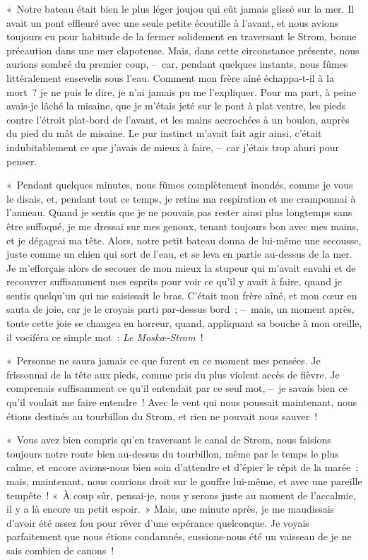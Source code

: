 \documentclass[french,twoside]{book} %
\begin{document}
« Notre bateau était bien le plus léger joujou qui eût jamais glissé sur la mer. Il avait un pont effleuré avec une seule petite écoutille à l’avant, et nous avions toujours eu pour habitude de la fermer solidement en traversant le Strom, bonne précaution dans une mer clapoteuse. Mais, dans cette circonstance présente, nous aurions sombré du premier coup, – car, pendant quelques instants, nous fûmes littéralement ensevelis sous l’eau. Comment mon frère aîné échappa-t-il à la mort ? je ne puis le dire, je n’ai jamais pu me l’expliquer. Pour ma part, à peine avais-je lâché la misaine, que je m’étais jeté sur le pont à plat ventre, les pieds contre l’étroit plat-bord de l’avant, et les mains accrochées à un boulon, auprès du pied du mât de misaine. Le pur instinct m’avait fait agir ainsi, c’était indubitablement ce que j’avais de mieux à faire, – car j’étais trop ahuri pour penser.\par
« Pendant quelques minutes, nous fûmes complètement inondés, comme je vous le disais, et, pendant tout ce temps, je retins ma respiration et me cramponnai à l’anneau. Quand je sentis que je ne pouvais pas rester ainsi plus longtemps sans être suffoqué, je me dressai sur mes genoux, tenant toujours bon avec mes mains, et je dégageai ma tête. Alors, notre petit bateau donna de lui-même une secousse, juste comme un chien qui sort de l’eau, et se leva en partie au-dessus de la mer. Je m’efforçais alors de secouer de mon mieux la stupeur qui m’avait envahi et de recouvrer suffisamment mes esprits pour voir ce qu’il y avait à faire, quand je sentis quelqu’un qui me saisissait le bras. C’était mon frère aîné, et mon cœur en sauta de joie, car je le croyais parti par-dessus bord ; – mais, un moment après, toute cette joie se changea en horreur, quand, appliquant sa bouche à mon oreille, il vociféra ce simple mot : \emph{Le Moskœ-Strom} !\par
« Personne ne saura jamais ce que furent en ce moment mes pensées. Je frissonnai de la tête aux pieds, comme pris du plus violent accès de fièvre. Je comprenais suffisamment ce qu’il entendait par ce seul mot, – je savais bien ce qu’il voulait me faire entendre ! Avec le vent qui nous poussait maintenant, nous étions destinés au tourbillon du Strom, et rien ne pouvait nous sauver !\par
« Vous avez bien compris qu’en traversant le canal de Strom, nous faisions toujours notre route bien au-dessus du tourbillon, même par le temps le plus calme, et encore avions-nous bien soin d’attendre et d’épier le répit de la marée ; mais, maintenant, nous courions droit sur le gouffre lui-même, et avec une pareille tempête ! « À coup sûr, pensai-je, nous y serons juste au moment de l’accalmie, il y a là encore un petit espoir. » Mais, une minute après, je me maudissais d’avoir été assez fou pour rêver d’une espérance quelconque. Je voyais parfaitement que nous étions condamnés, eussions-nous été un vaisseau de je ne sais combien de canons !\par
\end{document}
